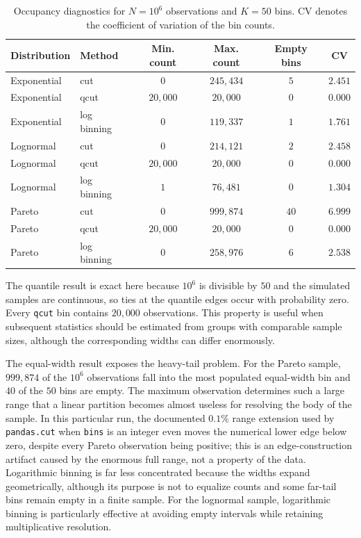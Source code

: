 \begin{table}[htbp]
\centering
\caption{Occupancy diagnostics for $N=10^6$ observations and $K=50$ bins. CV denotes the coefficient of variation of the bin counts.}
\label{tab:binning-results}
\renewcommand{\arraystretch}{1.22}
\begin{tabular*}{0.98\textwidth}{@{\extracolsep{\fill}}llcccc@{}}
\toprule
Distribution & Method & Min. count & Max. count & Empty bins & CV \\
\midrule
Exponential & cut & $0$ & $245{,}434$ & $5$ & $2.451$ \\
Exponential & qcut & $20{,}000$ & $20{,}000$ & $0$ & $0.000$ \\
Exponential & log binning & $0$ & $119{,}337$ & $1$ & $1.761$ \\
Lognormal & cut & $0$ & $214{,}121$ & $2$ & $2.458$ \\
Lognormal & qcut & $20{,}000$ & $20{,}000$ & $0$ & $0.000$ \\
Lognormal & log binning & $1$ & $76{,}481$ & $0$ & $1.304$ \\
Pareto & cut & $0$ & $999{,}874$ & $40$ & $6.999$ \\
Pareto & qcut & $20{,}000$ & $20{,}000$ & $0$ & $0.000$ \\
Pareto & log binning & $0$ & $258{,}976$ & $6$ & $2.538$ \\
\bottomrule
\end{tabular*}
\end{table}

The quantile result is exact here because $10^6$ is divisible by $50$ and the simulated samples are continuous, so ties at the quantile edges occur with probability zero. Every \texttt{qcut} bin contains $20{,}000$ observations. This property is useful when subsequent statistics should be estimated from groups with comparable sample sizes, although the corresponding widths can differ enormously.

The equal-width result exposes the heavy-tail problem. For the Pareto sample, $999{,}874$ of the $10^6$ observations fall into the most populated equal-width bin and $40$ of the $50$ bins are empty. The maximum observation determines such a large range that a linear partition becomes almost useless for resolving the body of the sample. In this particular run, the documented $0.1\%$ range extension used by \texttt{pandas.cut} when \texttt{bins} is an integer even moves the numerical lower edge below zero, despite every Pareto observation being positive; this is an edge-construction artifact caused by the enormous full range, not a property of the data. Logarithmic binning is far less concentrated because the widths expand geometrically, although its purpose is not to equalize counts and some far-tail bins remain empty in a finite sample. For the lognormal sample, logarithmic binning is particularly effective at avoiding empty intervals while retaining multiplicative resolution.


